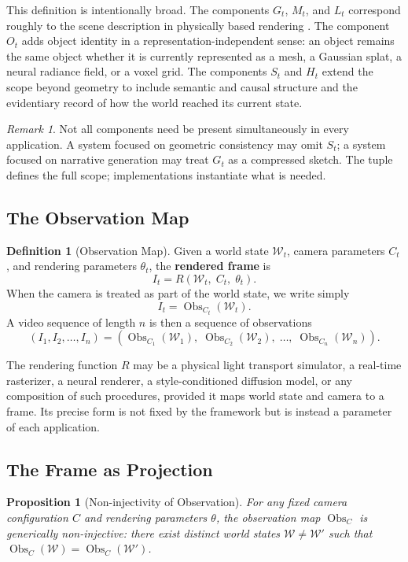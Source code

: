 \documentclass[11pt,a4paper]{article}
\theoremstyle{plain}
\newtheorem{proposition}[theorem]{Proposition}
\theoremstyle{definition}
\newtheorem{definition}[theorem]{Definition}
\theoremstyle{remark}
\newtheorem{remark}[theorem]{Remark}
\DeclareMathOperator{\Obs}{Obs}
\begin{document}
This definition is intentionally broad. The components $G_t$, $M_t$, and $L_t$ correspond roughly to the scene description in physically based rendering \cite{pharr2023pbr}. The component $O_t$ adds object identity in a representation-independent sense: an object remains the same object whether it is currently represented as a mesh, a Gaussian splat, a neural radiance field, or a voxel grid. The components $S_t$ and $H_t$ extend the scope beyond geometry to include semantic and causal structure and the evidentiary record of how the world reached its current state.

\begin{remark}
Not all components need be present simultaneously in every application. A system focused on geometric consistency may omit $S_t$; a system focused on narrative generation may treat $G_t$ as a compressed sketch. The tuple defines the full scope; implementations instantiate what is needed.
\end{remark}

\subsection{The Observation Map}

\begin{definition}[Observation Map]
Given a world state $\mathcal{W}_t$, camera parameters $C_t$, and rendering parameters $\theta_t$, the \textbf{rendered frame} is
\[
I_t = R(\mathcal{W}_t,\; C_t,\; \theta_t).
\]
When the camera is treated as part of the world state, we write simply
\[
I_t = \Obs_{C_t}(\mathcal{W}_t).
\]
A video sequence of length $n$ is then a sequence of observations
\[
(I_1, I_2, \ldots, I_n) = (\Obs_{C_1}(\mathcal{W}_1),\; \Obs_{C_2}(\mathcal{W}_2),\; \ldots,\; \Obs_{C_n}(\mathcal{W}_n)).
\]
\end{definition}

The rendering function $R$ may be a physical light transport simulator, a real-time rasterizer, a neural renderer, a style-conditioned diffusion model, or any composition of such procedures, provided it maps world state and camera to a frame. Its precise form is not fixed by the framework but is instead a parameter of each application.

\subsection{The Frame as Projection}

\begin{proposition}[Non-injectivity of Observation]
For any fixed camera configuration $C$ and rendering parameters $\theta$, the observation map $\Obs_C$ is generically non-injective: there exist distinct world states $\mathcal{W} \neq \mathcal{W}'$ such that $\Obs_C(\mathcal{W}) = \Obs_C(\mathcal{W}')$.
\end{proposition}
\end{document}
